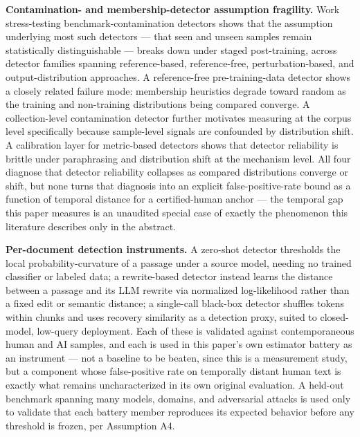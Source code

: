 \documentclass[11pt]{article}
\begin{document}
\textbf{Contamination- and membership-detector assumption fragility.} Work stress-testing benchmark-contamination detectors \citep{BenchContamFragility} shows that the assumption underlying most such detectors --- that seen and unseen samples remain statistically distinguishable --- breaks down under staged post-training, across detector families spanning reference-based, reference-free, perturbation-based, and output-distribution approaches. A reference-free pre-training-data detector \citep{MinKpp} shows a closely related failure mode: membership heuristics degrade toward random as the training and non-training distributions being compared converge. A collection-level contamination detector \citep{ContamICL} further motivates measuring at the corpus level specifically because sample-level signals are confounded by distribution shift. A calibration layer for metric-based detectors \citep{MarkovCalib} shows that detector reliability is brittle under paraphrasing and distribution shift at the mechanism level. All four diagnose that detector reliability collapses as compared distributions converge or shift, but none turns that diagnosis into an explicit false-positive-rate bound as a function of temporal distance for a certified-human anchor --- the temporal gap this paper measures is an unaudited special case of exactly the phenomenon this literature describes only in the abstract.

\textbf{Per-document detection instruments.} A zero-shot detector \citep{DetectGPT} thresholds the local probability-curvature of a passage under a source model, needing no trained classifier or labeled data; a rewrite-based detector \citep{LearnToDistance} instead learns the distance between a passage and its LLM rewrite via normalized log-likelihood rather than a fixed edit or semantic distance; a single-call black-box detector \citep{DnR} shuffles tokens within chunks and uses recovery similarity as a detection proxy, suited to closed-model, low-query deployment. Each of these is validated against contemporaneous human and AI samples, and each is used in this paper's own estimator battery as an instrument --- not a baseline to be beaten, since this is a measurement study, but a component whose false-positive rate on temporally distant human text is exactly what remains uncharacterized in its own original evaluation. A held-out benchmark spanning many models, domains, and adversarial attacks \citep{RAID} is used only to validate that each battery member reproduces its expected behavior before any threshold is frozen, per Assumption A4.
\end{document}
